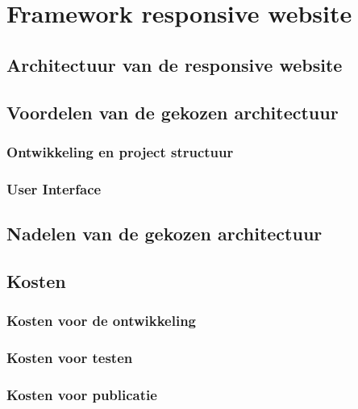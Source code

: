 \chapter{Framework responsive website}
\label{ch:frameworkresponsivewebsite}
\section{Architectuur van de responsive website}
\label{sec:voordelenvandegekozenwebarchitectuur}
\section{Voordelen van de gekozen architectuur}
\subsection{Ontwikkeling en project structuur}
\subsection{User Interface}
\label{sec:nadelenvandegekozenwebarchitectuur}
\section{Nadelen van de gekozen architectuur}

\label{sec:webkosten}
\section{Kosten}

\subsection{Kosten voor de ontwikkeling}
\subsection{Kosten voor testen}
\subsection{Kosten voor publicatie}
